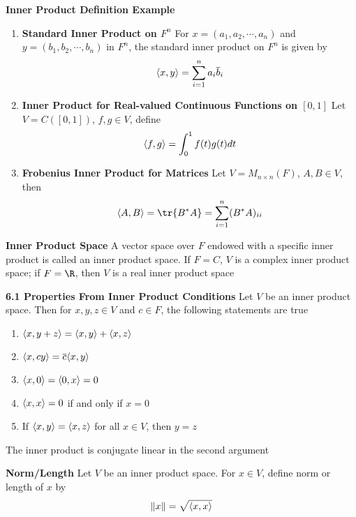 \documentclass[11pt]{article}
\begin{document}
\begin{defn*}
    \textbf{Inner Product Definition Example}
    \begin{enumerate}
        \item \textbf{Standard Inner Product on $F^n$} For $x = (a_1,a_2,\cdots,a_n)$ and $y=(b_1,b_2,\cdots, b_n)$ in $F^n$, the standard inner product on $F^n$ is given by 
        \[
            \langle x,y\rangle = \sum_{i=1}^n a_i \overline{b}_i    
        \]
        \item \textbf{Inner Product for Real-valued Continuous Functions on $[0,1]$} Let $V=C([0,1])$, $f,g\in V$, define 
        \[
            \langle f,g\rangle = \int_0^1 f(t) g(t) dt    
        \]
        \item \textbf{Frobenius Inner Product for Matrices} Let $V=M_{n\times n}(F)$, $A,B\in V$, then 
        \[
            \innerp{A}{B} = \tr{B^*A} = \sum_{i=1}^n (B^*A)_{ii}
        \]
    \end{enumerate}
\end{defn*}

\begin{defn*}
    \textbf{Inner Product Space} A vector space over $F$ endowed with a specific inner product is called an inner product space. If $F=C$, $V$ is a complex inner product space; if $F=\R$, then $V$ is a real inner product space
\end{defn*}

\begin{theorem*}
    \textbf{6.1 Properties From Inner Product Conditions} Let $V$ be an inner product space. Then for $x,y,z\in V$ and $c\in F$, the following statements are true 
    \begin{enumerate}
        \item $\langle x,y+z\rangle = \langle x,y\rangle + \langle x,z\rangle$
        \item $\langle x,cy\rangle = \overline{c} \langle x,y\rangle$
        \item $\langle x,0\rangle = \langle0,x\rangle = 0$
        \item $\langle x,x\rangle = 0$ if and only if $x=0$ 
        \item If $\langle x,y\rangle = \langle x,z\rangle$ for all $x\in V$, then $y=z$
    \end{enumerate}
    The inner product is conjugate linear in the second argument 
\end{theorem*}

\begin{defn*}
    \textbf{Norm/Length} Let $V$ be an inner product space. For $x\in V$, define norm or length of $x$ by 
    \[
        \left\lVert x\right\rVert = \sqrt{\langle x,x\rangle}    
    \]
\end{defn*}
\end{document}
